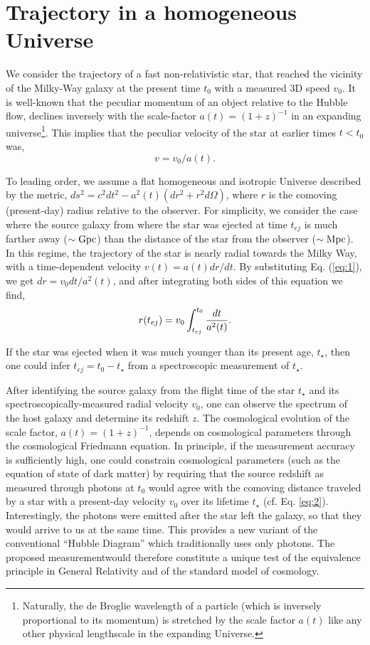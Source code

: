 \documentclass[11pt,preprint]{aastex}
\begin{document}
\section{Trajectory in a homogeneous Universe}

We consider the trajectory of a fast non-relativistic star, that
reached the vicinity of the Milky-Way galaxy at the present time $t_0$
with a measured 3D speed $v_0$. It is well-known that the peculiar
momentum of an object relative to the Hubble flow, declines inversely
with the scale-factor $a(t)=(1+z)^{-1}$ in an expanding
universe\footnote{Naturally, the de Broglie wavelength of a particle
(which is inversely proportional to its momentum) is stretched by the
scale factor $a(t)$ like any other physical lengthscale in the
expanding Universe.}. This implies that the peculiar velocity of the
star at earlier times $t<t_0$ was,
\begin{equation}
v=v_0/a(t).
\label{eq:1}
\end{equation}

To leading order, we assume a flat homogeneous and isotropic Universe
described by the metric, $ds^2=c^2dt^2-a^2(t)(dr^2+r^2d\Omega)$, where
$r$ is the comoving (present-day) radius relative to the observer. For
simplicity, we consider the case where the source galaxy from where
the star was ejected at time $t_{ej}$ is much farther away ($\sim {\rm
Gpc}$) than the distance of the star from the observer ($\sim {\rm
Mpc}$). In this regime, the trajectory of the star is nearly radial
towards the Milky Way, with a time-dependent velocity
$v(t)=a(t)dr/dt$. By substituting Eq. (\ref{eq:1}), we get $dr=v_0
dt/a^2(t)$, and after integrating both sides of this equation we find,
\begin{equation}
r(t_{ej})=v_0 \int_{t_{ej}}^{t_0} {dt \over a^2(t)} .
\label{eq:2}
\end{equation}

If the star was ejected when it was much younger than its present age,
$t_\star$, then one could infer $t_{ej}=t_0-t_\star$ from a
spectroscopic measurement of $t_\star$.

After identifying the source galaxy from the flight time of the star
$t_\star$ and its spectroscopically-measured radial velocity $v_0$,
one can observe the spectrum of the host galaxy and determine its
redshift $z$.  The cosmological evolution of the scale factor,
$a(t)=(1+z)^{-1}$, depends on cosmological parameters through the
cosmological Friedmann equation. In principle, if the measurement
accuracy is sufficiently high, one could constrain cosmological
parameters (such as the equation of state of dark matter) by requiring
that the source redshift as measured through photons at $t_0$ would
agree with the comoving distance traveled by a star with a present-day
velocity $v_0$ over its lifetime $t_\star$
(cf. Eq. \ref{eq:2}). Interestingly, the photons were emitted after
the star left the galaxy, so that they would arrive to us at the same
time.  This provides a new variant of the conventional ``Hubble
Diagram'' which traditionally uses only photons. The proposed
measurementwould therefore constitute a unique test of the equivalence
principle in General Relativity and of the standard model of
cosmology.
\end{document}
